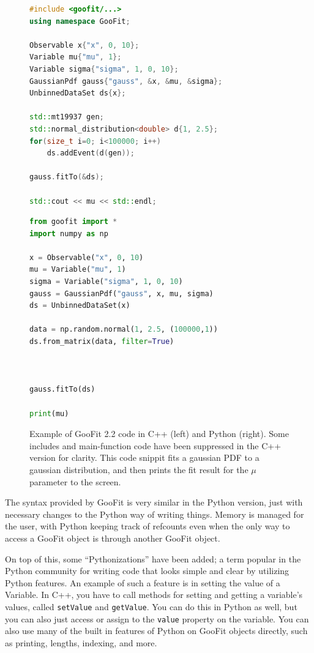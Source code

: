 \documentclass{webofc}
\begin{document}
\begin{figure}
	    \begin{minipage}{.51\textwidth}
		\begin{lstlisting}[language=C++]
#include <goofit/...>
using namespace GooFit;

Observable x{"x", 0, 10};
Variable mu{"mu", 1};
Variable sigma{"sigma", 1, 0, 10};
GaussianPdf gauss{"gauss", &x, &mu, &sigma};
UnbinnedDataSet ds{x};

std::mt19937 gen;
std::normal_distribution<double> d{1, 2.5};
for(size_t i=0; i<100000; i++)
	ds.addEvent(d(gen));

gauss.fitTo(&ds);

std::cout << mu << std::endl;
		\end{lstlisting}
	    \end{minipage}%
	    \begin{minipage}{.49\textwidth}
		\begin{lstlisting}[language=Python] 
from goofit import *
import numpy as np

x = Observable("x", 0, 10)
mu = Variable("mu", 1)
sigma = Variable("sigma", 1, 0, 10)
gauss = GaussianPdf("gauss", x, mu, sigma)
ds = UnbinnedDataSet(x)

data = np.random.normal(1, 2.5, (100000,1))
ds.from_matrix(data, filter=True)



gauss.fitTo(ds)

print(mu)
		\end{lstlisting}
	    \end{minipage}
	\caption{Example of GooFit 2.2 code in C++ (left) and Python (right). Some includes and main-function code have been suppressed in the C++ version for clarity. This code snippit fits a gaussian PDF to a gaussian distribution, and then prints the fit result for the $\mu$ parameter to the screen.}
	\label{fig-code}
\end{figure}

The syntax provided by GooFit is very similar in the Python version, just with necessary changes to the Python way of writing things. Memory is managed for the user, with Python keeping track of refcounts even when the only way to access a GooFit object is through another GooFit object.

On top of this, some ``Pythonizations'' have been added; a term popular in the Python community for writing code that looks simple and clear by utilizing Python features. An example of such a feature is in setting the value of a Variable. In C++, you have to call  methods for setting and getting a variable's values, called \texttt{setValue} and \texttt{getValue}. You can do this in Python as well, but you can also just access or assign to the \texttt{value} property on the variable. You can also use many of the built in features of Python on GooFit objects directly, such as printing, lengths, indexing, and more.
\end{document}
